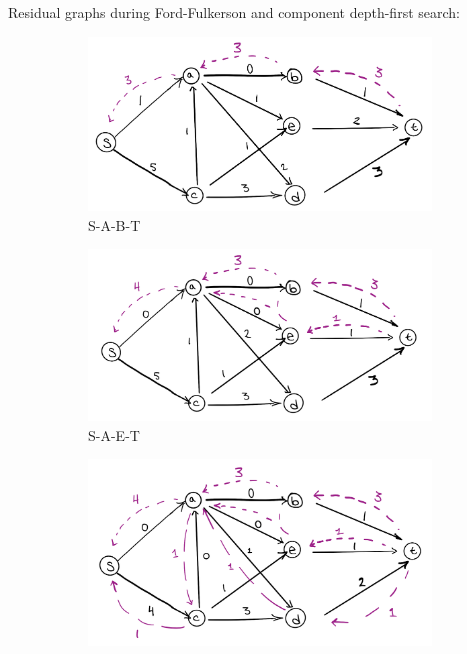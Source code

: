 \documentclass[conference]{styles/acmsiggraph}
\newcommand{\?}{\stackrel{?}{=}}
\begin{document}
Residual graphs during Ford-Fulkerson and component depth-first search:
\begin{figure}[h!]
    \centering
    \begin{subfigure}[b]{0.4\columnwidth}
        \includegraphics[width=.92\linewidth]{P2 Figs/2.1.PNG}
        \caption{S-A-B-T}
        \label{fig:2.1}
    \end{subfigure}
    \begin{subfigure}[b]{0.4\columnwidth}
        \includegraphics[width=.92\linewidth]{P2 Figs/2.2.PNG}
        \caption{S-A-E-T}
        \label{fig:2.2}
    \end{subfigure}
    \begin{subfigure}[b]{0.4\columnwidth}
        \includegraphics[width=.92\linewidth]{P2 Figs/2.3.PNG}

\end{subfigure}
\end{figure}
\end{document}
